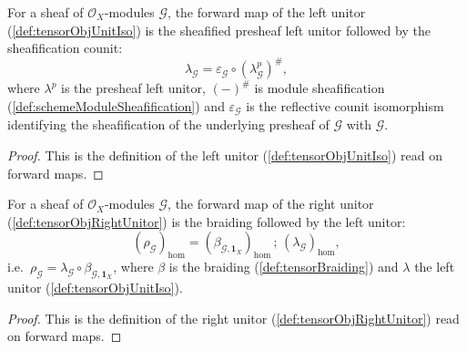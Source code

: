 \begin{lemma}
  \label{lem:tensorObjUnitIso_hom}
  For a sheaf of \(\mathcal{O}_X\)-modules \(\mathcal{G}\), the forward map of the
  left unitor (\cref{def:tensorObjUnitIso}) is the sheafified presheaf left unitor
  followed by the sheafification counit:
  \[
    \lambda_{\mathcal{G}}
      = \varepsilon_{\mathcal{G}} \circ (\lambda^p_{\mathcal{G}})^{\#},
  \]
  where \(\lambda^p\) is the presheaf left unitor, \((-)^{\#}\) is module
  sheafification (\cref{def:schemeModuleSheafification}) and
  \(\varepsilon_{\mathcal{G}}\) is the reflective counit isomorphism identifying
  the sheafification of the underlying presheaf of \(\mathcal{G}\) with
  \(\mathcal{G}\).
\end{lemma}

\begin{proof}


  This is the definition of the left unitor (\cref{def:tensorObjUnitIso}) read on
  forward maps.
\end{proof}

\begin{lemma}

  \label{lem:tensorObjRightUnitor_hom}
  For a sheaf of \(\mathcal{O}_X\)-modules \(\mathcal{G}\), the forward map of the
  right unitor (\cref{def:tensorObjRightUnitor}) is the braiding followed by the
  left unitor:
  \[
    (\rho_{\mathcal{G}})_{\mathrm{hom}}
      = (\beta_{\mathcal{G},\mathbf{1}_X})_{\mathrm{hom}}
        \,;\, (\lambda_{\mathcal{G}})_{\mathrm{hom}},
  \]
  i.e.\ \(\rho_{\mathcal{G}} = \lambda_{\mathcal{G}} \circ
  \beta_{\mathcal{G},\mathbf{1}_X}\), where \(\beta\) is the braiding
  (\cref{def:tensorBraiding}) and \(\lambda\) the left unitor
  (\cref{def:tensorObjUnitIso}).
\end{lemma}

\begin{proof}


  This is the definition of the right unitor (\cref{def:tensorObjRightUnitor}) read
  on forward maps.
\end{proof}

